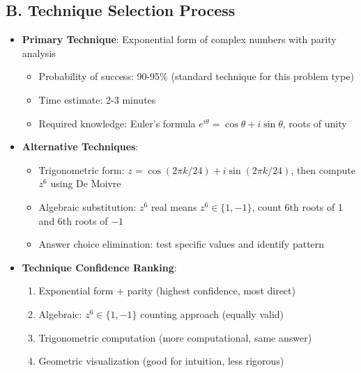 \documentclass[]{article}
\begin{document}
\begin{techniquesbox}
\subsection*{B. Technique Selection Process}
\begin{itemize}[leftmargin=*]
    \item \textbf{Primary Technique}: Exponential form of complex numbers with parity analysis
    \begin{itemize}
        \item Probability of success: 90-95\% (standard technique for this problem type)
        \item Time estimate: 2-3 minutes
        \item Required knowledge: Euler's formula $e^{i\theta} = \cos\theta + i\sin\theta$, roots of unity
    \end{itemize}
    \item \textbf{Alternative Techniques}:
    \begin{itemize}
        \item Trigonometric form: $z = \cos(2\pi k/24) + i\sin(2\pi k/24)$, then compute $z^6$ using De Moivre
        \item Algebraic substitution: $z^6$ real means $z^6 \in \{1, -1\}$, count 6th roots of 1 and 6th roots of $-1$
        \item Answer choice elimination: test specific values and identify pattern
    \end{itemize}
    \item \textbf{Technique Confidence Ranking}:
    \begin{enumerate}
        \item Exponential form + parity (highest confidence, most direct)
        \item Algebraic: $z^6 \in \{1,-1\}$ counting approach (equally valid)
        \item Trigonometric computation (more computational, same answer)
        \item Geometric visualization (good for intuition, less rigorous)
    \end{enumerate}
\end{itemize}


\end{techniquesbox}
\end{document}
